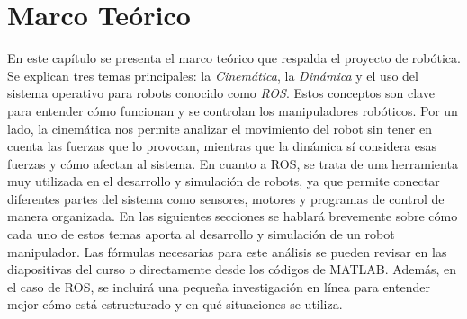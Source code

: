 \chapter{Marco Teórico}
\label{chap:marco_teorico}

En este capítulo se presenta el marco teórico que respalda el proyecto de robótica. Se explican tres temas principales: la \textit{Cinemática}, la \textit{Dinámica} y el uso del sistema operativo para robots conocido como \textit{ROS}. Estos conceptos son clave para entender cómo funcionan y se controlan los manipuladores robóticos. Por un lado, la cinemática nos permite analizar el movimiento del robot sin tener en cuenta las fuerzas que lo provocan, mientras que la dinámica sí considera esas fuerzas y cómo afectan al sistema. En cuanto a ROS, se trata de una herramienta muy utilizada en el desarrollo y simulación de robots, ya que permite conectar diferentes partes del sistema como sensores, motores y programas de control de manera organizada. En las siguientes secciones se hablará brevemente sobre cómo cada uno de estos temas aporta al desarrollo y simulación de un robot manipulador. Las fórmulas necesarias para este análisis se pueden revisar en las diapositivas del curso o directamente desde los códigos de MATLAB. Además, en el caso de ROS, se incluirá una pequeña investigación en línea para entender mejor cómo está estructurado y en qué situaciones se utiliza.

